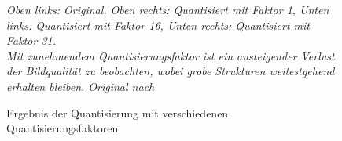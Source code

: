 \begin{figure}[h!]
    \caption{Ergebnis der Quantisierung mit verschiedenen Quantisierungsfaktoren}
    \textit{Oben links: Original, Oben rechts: Quantisiert mit Faktor 1, Unten links: Quantisiert mit Faktor 16, Unten rechts: Quantisiert mit Faktor 31.\\
    Mit zunehmendem Quantisierungsfaktor ist ein ansteigender Verlust der Bildqualität zu beobachten, wobei grobe Strukturen weitestgehend erhalten bleiben. Original nach \cite{brooke_cagle__2016}}
    \label{fig:quantization_multi_mquants}
\end{figure}



